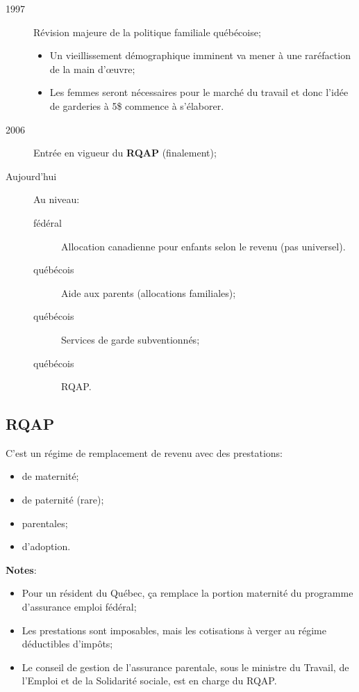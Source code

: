 \documentclass[10pt, french]{article}
\begin{document}
\begin{multicols*}{3}
\begin{description}
	\item[1997]	Révision majeure de la politique familiale \textcolor{blue(pigment)}{québécoise};
		\begin{itemize}[leftmargin = *]
		\item	Un vieillissement démographique imminent va mener à une raréfaction de la main d'œuvre;
		\item	Les femmes seront nécessaires pour le marché du travail et donc l'idée de garderies à 5\$ commence à s'élaborer.
		\end{itemize}
	\item[2006]	Entrée en vigueur du \textbf{\textcolor{blue(pigment)}{RQAP}} (finalement);
	\item[Aujourd'hui]	Au niveau:
		\begin{description}
		\item[\textcolor{bulgarianrose}{fédéral}]	Allocation canadienne pour enfants selon le revenu (pas universel).
		\item[\textcolor{blue(pigment)}{québécois}]	Aide aux parents (allocations familiales);
		\item[\textcolor{blue(pigment)}{québécois}]	Services de garde subventionnés;
		\item[\textcolor{blue(pigment)}{québécois}]	RQAP.
		\end{description}
\end{description}

\subsection*{RQAP}

C'est un régime de remplacement de revenu avec des prestations:
\begin{multicols*}{2}
\begin{itemize}[leftmargin = *]
\item	de maternité;
\item	de paternité (rare);
\item	parentales;
\item	d'adoption.
\end{itemize}
\end{multicols*}

\textbf{Notes}:
\begin{itemize}[leftmargin = *]
	\item	Pour un résident du \textcolor{blue(pigment)}{Québec}, ça remplace la portion maternité du programme d'assurance emploi \textcolor{bulgarianrose}{fédéral};
	\item	Les prestations sont imposables, mais les cotisations à verger au régime déductibles d'impôts;
	\item	Le conseil de gestion de l'assurance parentale, sous le ministre du Travail, de l'Emploi et de la Solidarité sociale, est en charge du RQAP.
\end{itemize}


\end{multicols*}
\end{document}
